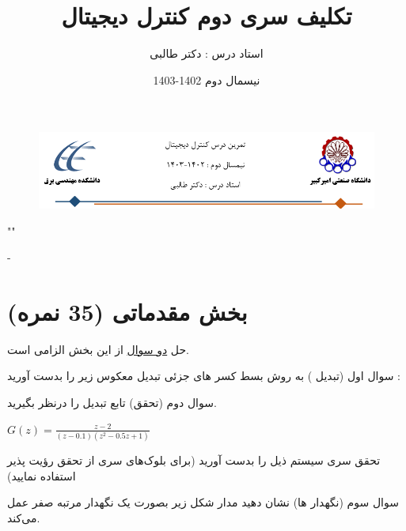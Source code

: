 \documentclass{article}
\title{تکلیف سری دوم کنترل دیجیتال}
\date{نیسمال دوم 1402-1403}
\author{استاد درس : دکتر طالبی}
\begin{document}
\markboth{\theauthor}{\thetitle}



\begin{figure}[htbp]
    \centering
    \includegraphics[width=\linewidth]{Header.png}
\end{figure}

\centering
""

-

\raggedleft
\section{بخش مقدماتی (35 نمره)}
\centering
حل \underline{دو سوال} از این بخش الزامی است.


    \begin{problem}{سوال اول}
    (تبدیل ) به روش بسط کسر های جزئی تبدیل معکوس  زیر را بدست آورید :
    
    \centering
    
    \end{problem}

    \begin{problem}{سوال دوم}
    	(تحقق) تابع تبدیل 
    	 را درنظر بگیرید.
    	 
    	 \centering
    	 $G(z) = \frac{z-2}{(z-0.1)(z^2-0.5z+1)}$
    	 
    	 \raggedright
	تحقق سری سیستم ذیل را بدست آورید (برای بلوک‌های سری از تحقق رؤیت پذیر استفاده نمایید)
    	 
    \end{problem}
    
    \begin{problem}{سوال سوم}
    	(نگهدار ها) نشان دهید مدار شکل زیر بصورت یک نگهدار مرتبه صفر عمل می‌کند.
    \end{problem}
    
\end{document}
